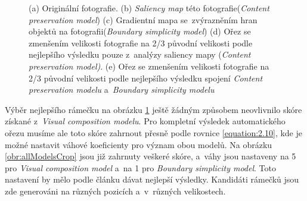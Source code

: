 \begin{figure}[H]
\caption{(a) Originální fotografie.
(b) \emph{Saliency map} \cite{Margolin2013} této fotografie(\emph{Content preservation model}) 
(c) Gradientní mapa se~zvýrazněním hran objektů na fotografii(\emph{Boundary simplicity model})
(d) Ořez se zmenšením velikosti fotografie na 2/3 původní velikosti podle nejlepšího výsledku pouze z~analýzy saliency mapy (\emph{Content preservation model)}. 
(e) Ořez se zmenšením velikosti fotografie na 2/3 původní velikosti podle nejlepšího výsledku spojení \emph{Content preservation modelu} a~\emph{Boundary simplicity modelu}}
\label{obr:modelsCrop}
\end{figure}

Výběr nejlepšího rámečku na obrázku \ref{obr:modelsCrop} ještě žádným způsobem neovlivnilo skóre získané z~\emph{Visual composition modelu}. Pro kompletní výsledek automatického ořezu musíme ale toto skóre zahrnout přesně podle rovnice \ref{equation:2.10}, kde je možné nastavit váhové koeficienty pro význam obou modelů. Na obrázku \ref{obr:allModelsCrop} jsou již zahrnuty veškeré skóre, a~váhy jsou nastaveny na 5 pro \emph{Visual composition model} a~na 1 pro \emph{Boundary simplicity model}. Toto nastavení by mělo podle článku \cite{Fang2014} dávat nejlepší výsledky. Kandidáti rámečků jsou zde generováni na různých pozicích a~v~různých velikostech.

